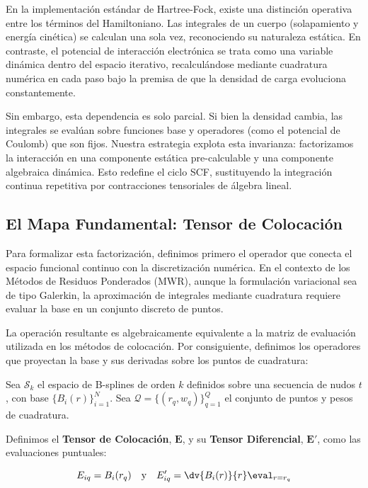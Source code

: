 En la implementación estándar de Hartree-Fock, existe una distinción operativa entre los términos del Hamiltoniano. Las integrales de un cuerpo (solapamiento y energía cinética) se calculan una sola vez, reconociendo su naturaleza estática. En contraste, el potencial de interacción electrónica se trata como una variable dinámica dentro del espacio iterativo, recalculándose mediante cuadratura numérica en cada paso bajo la premisa de que la densidad de carga evoluciona constantemente.

Sin embargo, esta dependencia es solo parcial. Si bien la densidad cambia, las integrales se evalúan sobre funciones base y operadores (como el potencial de Coulomb) que son fijos. Nuestra estrategia explota esta invarianza: factorizamos la interacción en una componente estática pre-calculable y una componente algebraica dinámica. Esto redefine el ciclo SCF, sustituyendo la integración continua repetitiva por contracciones tensoriales de álgebra lineal.

\subsection{El Mapa Fundamental: Tensor de Colocación}

Para formalizar esta factorización, definimos primero el operador que conecta el espacio funcional continuo con la discretización numérica. En el contexto de los Métodos de Residuos Ponderados (MWR), aunque la formulación variacional sea de tipo Galerkin, la aproximación de integrales mediante cuadratura requiere evaluar la base en un conjunto discreto de puntos.

La operación resultante es algebraicamente equivalente a la matriz de evaluación utilizada en los métodos de colocación. Por consiguiente, definimos los operadores que proyectan la base y sus derivadas sobre los puntos de cuadratura:

\begin{definition}

  Sea \( \mathcal{S}_k \) el espacio de B-splines de orden \( k \) definidos sobre una secuencia de nudos \( t \), con base \( \{ B_i(r) \}_{i=1}^N \).
  Sea \( \mathcal{Q} = \{ (r_q,w_q) \}_{q=1}^Q \) el conjunto de puntos y pesos de cuadratura.

  Definimos el \textbf{Tensor de Colocación}, \( \bm{E} \), y su \textbf{Tensor Diferencial}, \( \bm{E}' \), como las evaluaciones puntuales:

  \begin{equation}
    \label{eq:collocation-tensor}
    E_{iq} = B_i(r_q) \quad \text{y} \quad E'_{iq} = \dv{B_i(r)}{r} \eval_{r=r_q}
  \end{equation}

\end{definition}

